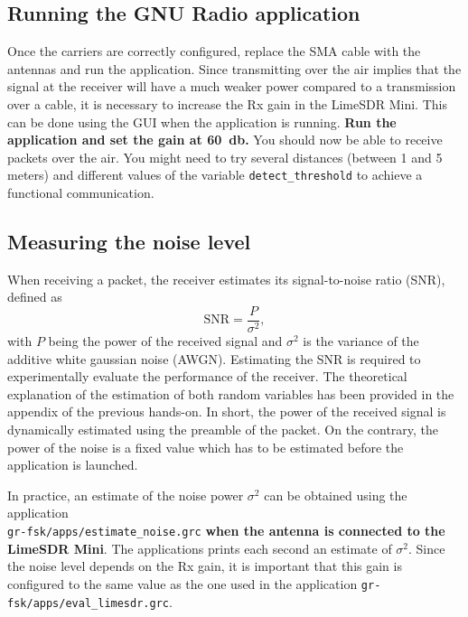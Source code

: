 \subsection{Running the GNU Radio application}

Once the carriers are correctly configured, replace the SMA cable with the antennas and run the application.
Since transmitting over the air implies that the signal at the receiver will have a much weaker power compared to a transmission over a cable,
it is necessary to increase the Rx gain in the LimeSDR Mini. This can be done using the GUI when the application is running. \textbf{Run the application and set the gain at \SI{60}{\decibel}.}
You should now be able to receive packets over the air.
You might need to try several distances (between 1 and 5 meters) and different values of the variable \texttt{detect\_threshold} to achieve a functional communication.

\subsection{Measuring the noise level}

When receiving a packet, the receiver estimates its signal-to-noise ratio (SNR), defined as
\begin{equation}
    \textrm{SNR} = \frac{P}{\sigma^2},
\end{equation}
with $P$ being the power of the received signal and $\sigma^2$ is the variance of the additive white gaussian noise (AWGN).
Estimating the SNR is required to experimentally evaluate the performance of the receiver.
The theoretical explanation of the estimation of both random variables has been provided in the appendix of the previous hands-on.
In short, the power of the received signal is dynamically estimated using the preamble of the packet.
On the contrary, the power of the noise is a fixed value which has to be estimated before the application is launched.

In practice, an estimate of the noise power $\sigma^2$ can be obtained using the application \\
\texttt{gr-fsk/apps/estimate\_noise.grc} \textbf{when the antenna is connected to the LimeSDR Mini}.
The applications prints each second an estimate of $\sigma^2$.
Since the noise level depends on the Rx gain, it is important that this gain is configured to the same value as the one used in the application
\texttt{gr-fsk/apps/eval\_limesdr.grc}.

